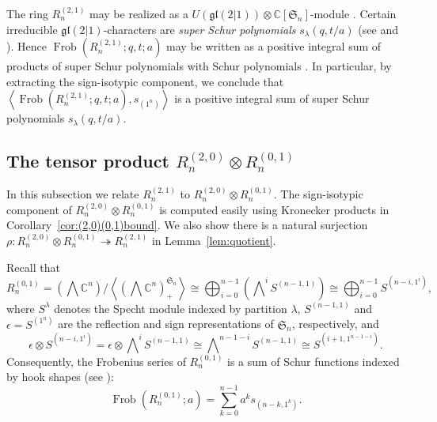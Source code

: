 \documentclass[11pt, noadjust, reqno]{amsart}
\theoremstyle{definition}
\theoremstyle{remark}
\numberwithin{equation}{section}
\newcommand{\0}{\emptyset}
\newcommand{\C}{\mathbb{C}}
\DeclareMathOperator{\Frob}{Frob}
\begin{document}
The ring $R_n^{(2,1)}$ may be realized as a $U(\mathfrak{gl}(2|1)) \otimes \C[\mathfrak{S}_n]$-module \cite{Lentfer-Supersymmetry}.
Certain irreducible $\mathfrak{gl}(2|1)$-characters are \emph{super Schur polynomials} $s_\lambda(q,t/a)$ (see \cite{BereleRegev} and \cite[Appendix A.2.2]{ChengWangBook}). 
Hence $\Frob(R_n^{(2,1)}; q,t; a)$ may be written as a positive integral sum of products of super Schur polynomials with Schur polynomials \cite{Lentfer-Supersymmetry}. 
In particular, by extracting the sign-isotypic component, we conclude that $\left \langle\Frob(R_n^{(2,1)}; q,t; a), s_{(1^n)}\right\rangle$ is a positive integral sum of super Schur polynomials $s_\lambda(q,t/a)$.

\subsection{The tensor product \texorpdfstring{$R_n^{(2,0)} \otimes R_n^{(0,1)}$}{Rn(2,0) otimes Rn(0,1)}} 
In this subsection we relate $R_n^{(2,1)}$ to $R_n^{(2,0)} \otimes R_n^{(0,1)}$. The sign-isotypic component of $R_n^{(2,0)} \otimes R_n^{(0,1)}$ is computed easily using Kronecker products in Corollary~\ref{cor:(2,0)(0,1)bound}. We also show there is a natural surjection $\rho: R_n^{(2,0)} \otimes R_n^{(0,1)} \twoheadrightarrow R_n^{(2,1)}$ in Lemma~\ref{lem:quotient}.
\medskip

Recall that 
\begin{equation*}
R_n^{(0,1)}= \left( \bigwedge\C^n\right)\Big/\left\langle \left( \bigwedge\C^n \right)^{\mathfrak{S}_n}_+ \right\rangle \cong \bigoplus_{i=0}^{n-1} \left(\bigwedge\nolimits^{i} S^{(n-1,1)} \right)
\cong \bigoplus_{i=0}^{n-1} S^{(n-i,1^i)},
\end{equation*}
where $S^\lambda$ denotes the Specht module indexed by partition $\lambda$, $S^{(n-1,1)}$ and $\epsilon=S^{(1^n)}$ are the reflection and sign representations of $\mathfrak{S}_n$, respectively, and 
\[\epsilon \otimes S^{(n-i,1^i)} = \epsilon \otimes \bigwedge\nolimits^{i} S^{(n-1,1)} \cong \bigwedge\nolimits^{n-1-i} S^{(n-1,1)} \cong 
S^{(i+1,1^{n-1-i})}.\]
Consequently, the Frobenius series of $R_n^{(0,1)}$ is a sum of Schur functions indexed by hook shapes (see {\cite[Lemma 4.10]{HaglundSergel}}):
\begin{equation*} \Frob(R_n^{(0,1)};a) =  \sum_{k=0}^{n-1} a^k s_{(n-k,1^k)}.\end{equation*}
\end{document}
